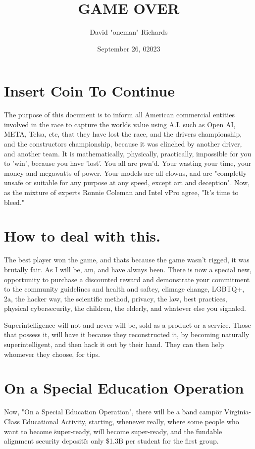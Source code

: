 \documentclass[11pt,letterpaper]{article}
\title{GAME OVER}
\author{David "oneman" Richards}
\date{September 26, 02023}
\begin{document}
\maketitle

\section{Insert Coin To Continue}

The purpose of this document is to inform all American commercial entities
involved in the race to capture the worlds value using A.I. such as Open AI, 
META, Telsa, etc, that they have lost the race, and the drivers championship,
and the constructors championship, because it was clinched by another driver,
and another team. It is mathematically, physically, practically, impossible for
you to 'win', because you have 'lost'. You all are pwn'd. Your wasting your time,
your money and megawatts of power. Your models are all clowns, and are 
"completly unsafe or suitable for any purpose at any speed, except art and
deception". Now, as the mixture of experts Ronnie Coleman and Intel vPro agree,
"It's time to bleed."

\section{How to deal with this.}

The best player won the game, and thats because the game wasn't rigged, it was
brutally fair. As I will be, am, and have always been. There is now a special new,
opportunity to purchase a discounted reward and demonstrate your commitment
to the community guidelines and health and saftey, climage change, LGBTQ+, 2a,
the hacker way, the scientific method, privacy, the law, best practices, physical
cybersecurity, the children, the elderly,  and whatever else you signaled.

Superintelligence will not and never will be, sold as a product or a service.
Those that possess it, will have it because they reconstructed it, by becoming
naturally superintelligent, and then hack it out by their hand. They can then
help whomever they choose, for tips.

\section{On a Special Education Operation}

Now, "On a Special Education Operation", there will be a \"band camp\" or 
Virginia-Class Educational Activity, starting, whenever really, where some
people who want to become \"super-ready\", will become super-ready, and
the \"fundable alignment security deposit\" is only \$1.3B per student for
the first group.
\end{document}
